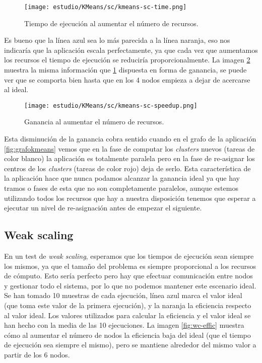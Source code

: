 \begin{figure}[H]
	\centering 
	\caption{Tiempo de ejecución al aumentar el número de recursos.}
	\texttt{[image: estudio/KMeans/sc/kmeans-sc-time.png]}
	\label{fig:sc-time}
\end{figure}

Es bueno que la línea azul sea lo más parecida a la línea naranja, eso nos indicaría que la aplicación escala perfectamente, ya que cada vez que aumentamos los recursos el tiempo de ejecución se reduciría proporcionalmente. La imagen \ref{fig:sc-speedup} muestra la misma información que \ref{fig:sc-time} dispuesta en forma de ganancia, se puede ver que se comporta bien hasta que en los 4 nodos empieza a dejar de acercarse al ideal.

\begin{figure}[H]
	\centering 
	\caption{Ganancia al aumentar el número de recursos.}
	\texttt{[image: estudio/KMeans/sc/kmeans-sc-speedup.png]}
	\label{fig:sc-speedup}
\end{figure}
 
Esta disminución de la ganancia cobra sentido cuando en el grafo de la aplicación \ref{fig:grafokmeans} vemos que en la fase de computar los \textit{clusters} nuevos (tareas de color blanco) la aplicación es totalmente paralela pero en la fase de re-asignar los centros de los \textit{clusters} (tareas de color rojo) deja de serlo. Esta característica de la aplicación hace que nunca podamos alcanzar la ganancia ideal ya que hay tramos o fases de esta que no son completamente paralelos, aunque estemos utilizando todos los recursos que hay a nuestra disposición tenemos que esperar a ejecutar un nivel de re-asignación antes de empezar el siguiente. 

\subsection{Weak scaling}

En un test de \textit{weak scaling}, esperamos que los tiempos de ejecución sean siempre los mismos, ya que el tamaño del problema es siempre proporcional a los recursos de cómputo. Esto sería perfecto pero hay que efectuar comunicación entre nodos y gestionar todo el sistema, por lo que no podemos mantener este escenario ideal. Se han tomado 10 muestras de cada ejecución, línea azul marca el valor ideal (que toma este valor de la primera ejecución), y la naranja la eficiencia respecto al valor ideal. Los valores utilizados para calcular la eficiencia y el valor ideal se han hecho con la media de las 10 ejecuciones. La imagen \ref{fig:wc-effic} muestra cómo al aumentar el número de nodos la eficiencia baja del ideal (que el tiempo de ejecución sea siempre el mismo), pero se mantiene alrededor del mismo valor a partir de los 6 nodos.

